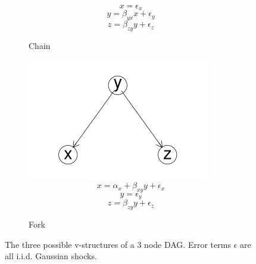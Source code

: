 \documentclass{article}
\begin{document}
\begin{figure}
\begin{subfigure}{0.3\textwidth}
    \small
    \begin{equation*}
      x = \epsilon_{x}
    \end{equation*}
    \begin{equation*}
      y = \beta_{yx} x + \epsilon_{y}
    \end{equation*}
    \begin{equation*}
      z = \beta_{zy} y + \epsilon_{z}
    \end{equation*}
    \caption{Chain}
    \label{chain}
  \end{subfigure}
  \begin{subfigure}{0.3\textwidth}
    \includegraphics[width=\linewidth]{images/fork.png}
    \small
    \begin{equation*}
      x = \alpha_x + \beta_{xy} y + \epsilon_{x}
    \end{equation*}
    \begin{equation*}
      y = \epsilon_{y}
    \end{equation*}
    \begin{equation*}
      z = \beta_{zy} y + \epsilon_{z}
    \end{equation*}
    \caption{Fork}
    \label{fork}
  \end{subfigure}

  \caption{The three possible v-structures of a 3 node DAG. Error terms $\epsilon$ are all i.i.d. Gaussian shocks.}
  \label{dag5}
\end{figure}
\end{document}
